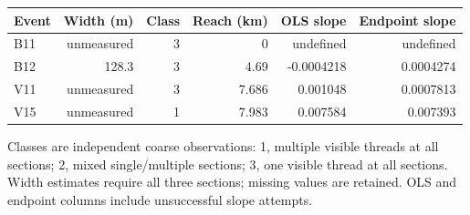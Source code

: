 \small\begin{tabular}{lrrrrr}
\toprule Event & Width (m) & Class & Reach (km) & OLS slope & Endpoint slope\\\midrule
B11 & unmeasured & 3 & 0 & undefined & undefined\\
B12 & 128.3 & 3 & 4.69 & -0.0004218 & 0.0004274\\
V11 & unmeasured & 3 & 7.686 & 0.001048 & 0.0007813\\
V15 & unmeasured & 1 & 7.983 & 0.007584 & 0.007393\\
\bottomrule\end{tabular}\normalsize\par
Classes are independent coarse observations: 1, multiple visible threads at all sections; 2, mixed single/multiple sections; 3, one visible thread at all sections. Width estimates require all three sections; missing values are retained. OLS and endpoint columns include unsuccessful slope attempts.
